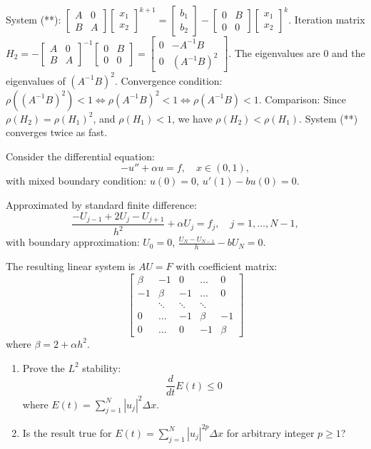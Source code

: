 \begin{solution}
System (**): $\begin{bmatrix} A & 0 \\ B & A \end{bmatrix} \begin{bmatrix} x_1 \\ x_2 \end{bmatrix}^{k+1} = \begin{bmatrix} b_1 \\ b_2 \end{bmatrix} - \begin{bmatrix} 0 & B \\ 0 & 0 \end{bmatrix} \begin{bmatrix} x_1 \\ x_2 \end{bmatrix}^k$.
Iteration matrix $H_2 = -\begin{bmatrix} A & 0 \\ B & A \end{bmatrix}^{-1} \begin{bmatrix} 0 & B \\ 0 & 0 \end{bmatrix} = \begin{bmatrix} 0 & -A^{-1}B \\ 0 & (A^{-1}B)^2 \end{bmatrix}$.
The eigenvalues are 0 and the eigenvalues of $(A^{-1}B)^2$.
Convergence condition: $\rho((A^{-1}B)^2) < 1 \iff \rho(A^{-1}B)^2 < 1 \iff \rho(A^{-1}B) < 1$.
Comparison: Since $\rho(H_2) = \rho(H_1)^2$, and $\rho(H_1) < 1$, we have $\rho(H_2) < \rho(H_1)$. System (**) converges twice as fast.
\end{solution}

\begin{exercise}
\label{applied:2017:5}
Consider the differential equation:
\[
-u''+\alpha u=f,\quad x\in(0,1),
\]
with mixed boundary condition: $u(0)=0$, $u'(1)-bu(0)=0$.

Approximated by standard finite difference:
\[
\frac{-U_{j-1}+2U_{j}-U_{j+1}}{h^{2}}+\alpha U_{j}=f_{j},\quad j=1,\dots,N-1,
\]
with boundary approximation: $U_{0}=0$, $\frac{U_{N}-U_{N-1}}{h}-bU_{N}=0$.

The resulting linear system is $AU=F$ with coefficient matrix:
\[
\begin{bmatrix}\beta&-1&0&\dots&0\\-1&\beta&-1&\dots&0\\&\ddots&\ddots&\ddots&\\0&\dots&-1&\beta&-1\\0&\dots&0&-1&\beta\end{bmatrix}
\]
where $\beta=2+\alpha h^{2}$.

\begin{enumerate}
\item[(a)] Prove the $L^{2}$ stability:
\[
\frac{d}{dt}E(t)\leq 0
\]
where $E(t)=\sum_{j=1}^{N}|u_{j}|^{2}\Delta x$.
\item[(b)] Is the result true for $E(t)=\sum_{j=1}^{N}|u_{j}|^{2p}\Delta x$ for arbitrary integer $p\geq 1$?
\end{enumerate}
\end{exercise}

